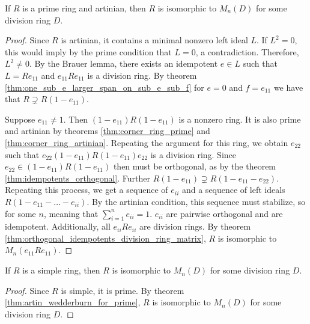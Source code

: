 \begin{theorem}
  \label{thm:artin_wedderburn_for_prime}
  \leanok
  If $R$ is a prime ring and artinian, then $R$ is isomorphic to $M_n(D)$ for some division ring $D$.
\end{theorem}
\begin{proof}
  \leanok
  Since $R$ is artinian, it contains a minimal nonzero left ideal $L$. If $L^2 = 0$, this would imply by the prime condition that $L = 0$, a contradiction. Therefore, $L^2 \neq 0$. By the Brauer lemma, there exists an idempotent $e \in L$ such that $L = Re_{11}$ and $e_{11}Re_{11}$ is a division ring. By theorem \ref{thm:one_sub_e_larger_span_on_sub_e_sub_f} for $e = 0$ and $f = e_{11}$ we have that $R \supsetneq R(1 - e_{11})$.

  Suppose $e_{11} \neq 1$. Then $(1 - e_{11}) R (1 - e_{11})$ is a nonzero ring. It is also prime and artinian by theorems \ref{thm:corner_ring_prime} and \ref{thm:corner_ring_artinian}. Repeating the argument for this ring, we obtain $e_{22}$ such that $e_{22}(1 - e_{11}) R (1 - e_{11})e_{22}$ is a division ring. Since $e_{22} \in (1 - e_{11}) R (1 - e_{11})$ then must be orthogonal, as by the theorem \ref{thm:idempotents_orthogonal}. Further $R (1 - e_{11}) \supsetneq R (1 - e_{11} - e_{22})$. Repeating this process, we get a sequence of $e_{ii}$ and a sequence of left ideals $R(1 - e_{11} - \ldots - e_{ii})$. By the artinian condition, this sequence must stabilize, so for some $n$, meaning that $\sum_{i = 1}^{n} e_{ii} = 1$. $e_{ii}$ are pairwise orthogonal and are idempotent. Additionally, all $e_{ii} R e_{ii}$ are division rings. By theorem \ref{thm:orthogonal_idempotents_division_ring_matrix}, $R$ is isomorphic to $M_n(e_{11}Re_{11})$.
\end{proof}

\begin{theorem}
  \label{thm:artin_wedderburn_for_simple}
  \leanok
  If $R$ is a simple ring, then $R$ is isomorphic to $M_n(D)$ for some division ring $D$.
\end{theorem}
\begin{proof}
  \leanok
  Since $R$ is simple, it is prime. By theorem \ref{thm:artin_wedderburn_for_prime}, $R$ is isomorphic to $M_n(D)$ for some division ring $D$.
\end{proof}


